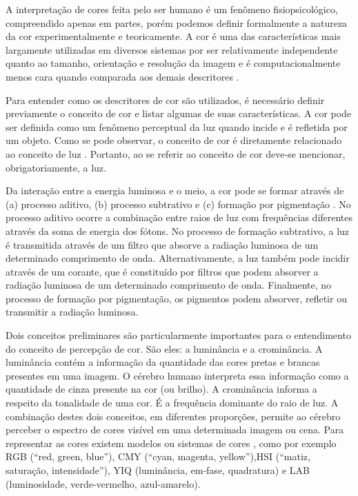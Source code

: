A interpretação de cores feita pelo ser humano é um fenômeno fisiopsicológico, compreendido apenas em partes, porém podemos definir formalmente a natureza da cor experimentalmente e teoricamente. A cor é uma das características mais largamente utilizadas em diversos sistemas por ser relativamente independente quanto ao tamanho, orientação e resolução da imagem e é computacionalmente menos cara quando comparada aos demais descritores \cite{Bender}. 

Para entender como os descritores de cor são utilizados, é necessário definir previamente o conceito de cor e listar algumas de suas características. A cor pode ser definida como um fenômeno perceptual da luz quando incide e é refletida por um objeto. Como se pode observar, o conceito de cor é diretamente relacionado ao conceito de luz \cite {Gonzalez}. Portanto, ao se referir ao conceito de cor deve-se mencionar, obrigatoriamente, a luz.

Da interação entre a energia luminosa e o meio, a cor pode se formar através de (a) processo aditivo, (b) processo subtrativo e (c) formação por pigmentação \cite{Bender}. No processo aditivo ocorre a combinação entre raios de luz com frequências diferentes através da soma de energia dos fótons. No processo de formação subtrativo, a luz é transmitida através de um filtro que absorve a radiação luminosa de um determinado comprimento de onda. Alternativamente, a luz também pode incidir através de um corante, que é constituído por filtros que podem absorver a radiação luminosa de um determinado comprimento de onda. Finalmente, no processo de formação por pigmentação, os pigmentos podem absorver, refletir ou transmitir a radiação luminosa. 

Dois conceitos preliminares são particularmente importantes para o entendimento do conceito de percepção de cor. São eles: a luminância e a crominância. A luminância contém a informação da quantidade das cores pretas e brancas presentes em uma imagem. O cérebro humano interpreta essa informação como a quantidade de cinza presente na cor (ou brilho). A crominância informa a respeito da tonalidade de uma cor. É a frequência dominante do raio de luz. A combinação destes dois conceitos, em diferentes proporções, permite ao cérebro perceber o espectro de cores visível em uma determinada imagem ou cena. Para representar as cores existem modelos ou sistemas de cores \cite {Gonzalez}, como por exemplo RGB (“red, green, blue”), CMY (“cyan, magenta, yellow”),HSI (“matiz, saturação, intensidade”), YIQ (luminância, em-fase, quadratura) e LAB (luminosidade, verde-vermelho, azul-amarelo).


